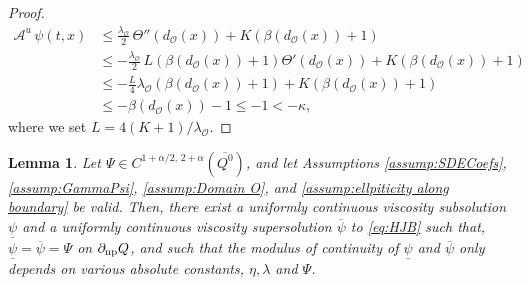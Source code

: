 \documentclass[amscd,amssymb,11pt]{article}
\newtheorem{lemma}[theorem]{Lemma}
\numberwithin{theorem}{section}
\numberwithin{equation}{section}
\begin{document}
\begin{proof}
\begin{align*}
\mathscr{A}^{u}\,\psi(t,x)&\leq\frac{\lambda_{\mathscr{O}}}{2}\,\Theta''(d_{\mathscr{O}}(x))+K\left(\beta(d_{\mathscr{O}}(x))+1\right)\\
&\leq -\frac{\lambda_{\mathscr{O}}}{2}\,L\left(\beta(d_{\mathscr{O}}(x))+1\right)\Theta'(d_{\mathscr{O}}(x))+K\left(\beta(d_{\mathscr{O}}(x))+1\right)\\
&\leq -\frac{L}{4}\lambda_{\mathscr{O}}\left(\beta(d_{\mathscr{O}}(x))+1\right)+K\left(\beta(d_{\mathscr{O}}(x))+1\right)\\
&\leq -\beta(d_{\mathscr{O}}(x))-1\leq -1<-\kappa,
\end{align*}
where we set $L=4(K+1)/\lambda_{\mathscr{O}}$.
\end{proof}

\begin{lemma}\label{lem:barfun}
Let $\Psi\in C^{1+\alpha/2,\,2+\alpha}(\overline{Q^{0}})$, and let Assumptions \ref{assump:SDECoefs},
\ref{assump:GammaPsi}, \ref{assump:Domain O}, and \ref{assump:ellpiticity along boundary} be valid. Then, there exist a uniformly continuous viscosity subsolution $\underline{\psi}$ and a uniformly continuous viscosity supersolution $\overline{\psi}$ to \eqref{eq:HJB} such that, $\underline{\psi}=\overline{\psi}=\Psi$ on $\partial_{{\rm np}}Q$, and such that the modulus of continuity of $\underline{\psi}$ and $\overline{\psi}$ only depends on various absolute constants, $\eta,\lambda$ and $\Psi$.
\end{lemma}
\end{document}

